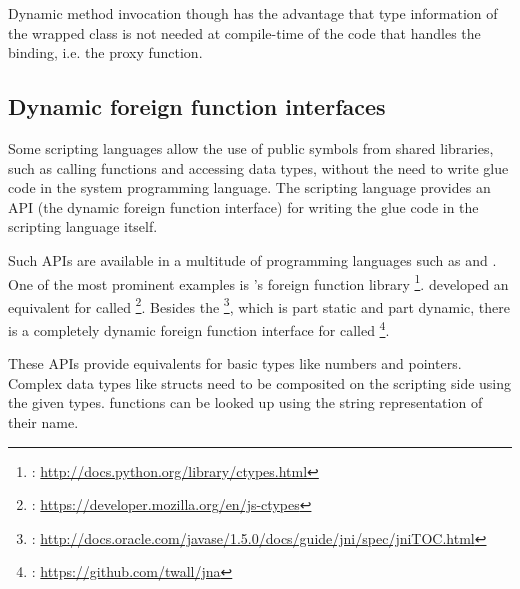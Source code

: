 Dynamic method invocation though has the advantage that type information of the wrapped class is not needed at compile-time of the code that handles the binding, i.e. the proxy function.


\subsection{Dynamic foreign function interfaces}
\label{sec:DynamicFFI}

Some scripting languages allow the use of public symbols from shared libraries, such as calling functions and accessing data types, without the need to write glue code in the system programming language. The scripting language provides an API (the dynamic foreign function interface) for writing the glue code in the scripting language itself.

Such APIs are available in a multitude of programming languages such as  and . One of the most prominent examples is 's foreign function library \footnote{: \url{http://docs.python.org/library/ctypes.html}}.  developed an equivalent for  called \footnote{: \url{https://developer.mozilla.org/en/js-ctypes}}. Besides the \footnote{: \url{http://docs.oracle.com/javase/1.5.0/docs/guide/jni/spec/jniTOC.html}}, which is part static and part dynamic, there is a completely dynamic foreign function interface for  called \footnote{: \url{https://github.com/twall/jna}}.

These APIs provide equivalents for basic  types like numbers and pointers. Complex data types like structs need to be composited on the scripting side using the given types.  functions can be looked up using the string representation of their name.

